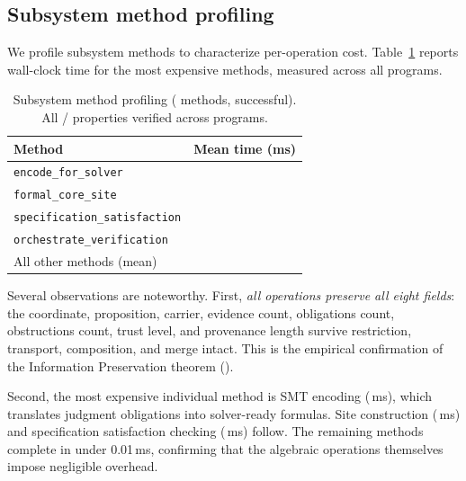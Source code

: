 \documentclass[11pt]{article}
\begin{document}
\subsection{Subsystem method profiling}\label{ssec:op-perf}

We profile \compMethodsTested{} subsystem methods to characterize
per-operation cost.  Table~\ref{tab:op-perf} reports wall-clock time
for the most expensive methods, measured across all \compTotalPrograms{}
programs.

\begin{table}[t]
\centering
\caption{Subsystem method profiling (\compMethodsTested{} methods,
  \compMethodsSuccessful{} successful).  All \compPropsOkSum{}/\compPropsSum{}
  properties verified across \compTotalPrograms{} programs.}
\label{tab:op-perf}
\begin{tabular}{@{}lr@{}}
\toprule
\textbf{Method} & \textbf{Mean time (ms)} \\
\midrule
\texttt{encode\_for\_solver}              & \compProfEncodeForSolverMeanMs{} \\
\texttt{formal\_core\_site}               & \compProfFormalCoreSiteMeanMs{} \\
\texttt{specification\_satisfaction}       & \compProfSpecificationSatisfactionMeanMs{} \\
\texttt{orchestrate\_verification}         & \compProfOrchestrateVerificationMeanMs{} \\
All other methods (mean)                   & \compMethodsMeanMs{} \\
\bottomrule
\end{tabular}
\end{table}

Several observations are noteworthy.  First, \emph{all operations preserve
all eight fields}: the coordinate, proposition, carrier, evidence count,
obligations count, obstructions count, trust level, and provenance length
survive restriction, transport, composition, and merge intact.  This is
the empirical confirmation of the Information Preservation theorem
().

Second, the most expensive individual method is SMT encoding
(\compProfEncodeForSolverMeanMs{}\,ms), which translates judgment
obligations into solver-ready formulas.  Site construction
(\compProfFormalCoreSiteMeanMs{}\,ms) and specification satisfaction
checking (\compProfSpecificationSatisfactionMeanMs{}\,ms) follow.
The remaining methods complete in under 0.01\,ms, confirming that
the algebraic operations themselves impose negligible overhead.
\end{document}
